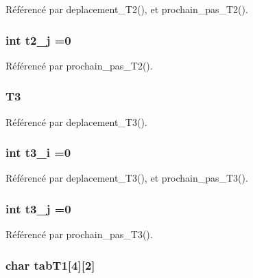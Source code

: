 Référencé par deplacement\+\_\+\+T2(), et prochain\+\_\+pas\+\_\+\+T2().

\subsubsection[{t2\+\_\+j}]{\setlength{\rightskip}{0pt plus 5cm}int t2\+\_\+j =0}\label{thread_8h_ab88718510b8996c0a7add100d4bc2c26}


Référencé par prochain\+\_\+pas\+\_\+\+T2().

\subsubsection[{T3}]{ T3}\label{thread_8h_a79960566a6908cd12bcfec57c02e4981}


Référencé par deplacement\+\_\+\+T3().

\subsubsection[{t3\+\_\+i}]{\setlength{\rightskip}{0pt plus 5cm}int t3\+\_\+i =0}\label{thread_8h_ade48de6836e075d2438d4318c2d384e1}


Référencé par deplacement\+\_\+\+T3(), et prochain\+\_\+pas\+\_\+\+T3().

\subsubsection[{t3\+\_\+j}]{\setlength{\rightskip}{0pt plus 5cm}int t3\+\_\+j =0}\label{thread_8h_a2abaab027ef8c5aba4299c98b8ce5ff6}


Référencé par prochain\+\_\+pas\+\_\+\+T3().

\subsubsection[{tab\+T1}]{\setlength{\rightskip}{0pt plus 5cm}char tab\+T1[4][2]}\label{thread_8h_a83a7ab050ef5f6001530bab2951d76f4}


